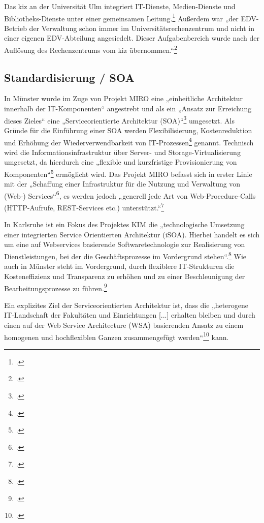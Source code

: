 Das kiz an der Universität Ulm integriert IT-Dienste, Medien-Dienste und Bibliotheks-Dienste unter einer gemeinsamen Leitung.\footcite{uniulm_wiruberuns_2015} Außerdem war „der EDV-Betrieb der Verwaltung schon immer im Universitätsrechenzentrum und nicht in einer eigenen EDV-Abteilung angesiedelt. Dieser Aufgabenbereich wurde nach der Auflösung des Rechenzentrums vom kiz übernommen.“\footcite{uniulm_diensleistungen_2015}

\subsection{Standardisierung / SOA}
In Münster wurde im Zuge von Projekt MIRO eine „einheitliche Architektur innerhalb der IT-Komponenten“ angestrebt und als ein „Ansatz zur Erreichung dieses Zieles“ eine „Serviceorientierte Architektur (SOA)“\footcite[51]{bode_informationsmanagement_2010} umgesetzt. Als Gründe für die Einführung einer SOA werden Flexibilisierung, Kostenreduktion und Erhöhung der Wiederverwendbarkeit von IT-Prozessen\footcite[51]{bode_informationsmanagement_2010} genannt. Technisch wird die Informationsinfrastruktur über Server- und Storage-Virtualisierung umgesetzt, da hierdurch eine „flexible und kurzfristige Provisionierung von Komponenten“\footcite[52]{bode_informationsmanagement_2010} ermöglicht wird.
\newpage
Das Projekt MIRO befasst sich in erster Linie mit der „Schaffung einer Infrastruktur für die Nutzung und Verwaltung von (Web-) Services“\footcite[52]{bode_informationsmanagement_2010}, es werden jedoch „generell jede Art von Web-Procedure-Calls (HTTP-Aufrufe, REST-Services etc.) unterstützt.“\footcite[52]{bode_informationsmanagement_2010}

In Karlsruhe ist ein Fokus des Projektes KIM die „technologische Umsetzung einer integrierten Service Orientierten Architektur (iSOA). Hierbei handelt es sich um eine auf Webservices basierende Softwaretechnologie zur Realisierung von Dienstleistungen, bei der die Geschäftsprozesse im Vordergrund stehen“.\footcite{kit_kim_projekt_2012}
Wie auch in Münster steht im Vordergrund, durch flexiblere IT-Strukturen die Kosteneffizienz und Transparenz zu erhöhen und zu einer Beschleunigung der Bearbeitungsprozesse zu führen.\footcite{kit_kim_projekt_2012}

Ein explizites Ziel der Serviceorientierten Architektur ist, dass die „heterogene IT-Landschaft der Fakultäten und Einrichtungen [...] erhalten bleiben und durch einen auf der Web Service Architecture (WSA) basierenden Ansatz zu einem homogenen und hochflexiblen Ganzen zusammengefügt werden“\footcite{kit_kim_projekt_2012} kann.

